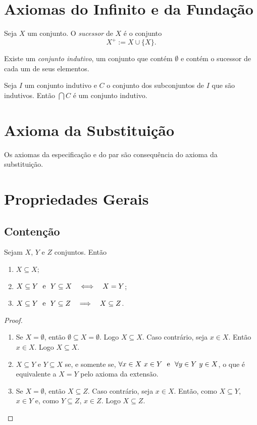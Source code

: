 \section{Axiomas do Infinito e da Fundação}

\begin{defi}
Seja $X$ um conjunto. O \emph{sucessor} de $X$ é o conjunto
	\begin{equation*}
	X^+ := X \cup \{X\}.
	\end{equation*}
\end{defi}

\begin{axi}
Existe um \emph{conjunto indutivo}, um conjunto que contém $\emptyset$ e contém o sucessor de cada um de seus elementos.
\end{axi}

\begin{prop}
Seja $I$ um conjunto indutivo e $C$ o conjunto dos subconjuntos de $I$ que são indutivos. Então $\bigcap C$ é um conjunto indutivo.
\end{prop}

\section{Axioma da Substituição}

Os axiomas da especificação e do par são consequência do axioma da substituição.


\section*{Propriedades Gerais}

\subsection*{Contenção}

\begin{prop}
Sejam $X$, $Y$ e $Z$ conjuntos. Então
	\begin{enumerate}
	\item $X \subseteq X$;
	\item $X \subseteq Y \text{\ \ e\ \ } Y \subseteq X \quad \Longleftrightarrow \quad X=Y$;
	\item $X \subseteq Y \text{\ \ e\ \ } Y \subseteq Z \quad \Longrightarrow \quad X \subseteq Z$.
	\end{enumerate}
\end{prop}
\begin{proof}
	\begin{enumerate}
	\item Se $X=\emptyset$, então $\emptyset \subseteq X = \emptyset$. Logo $X \subseteq X$. Caso contrário, seja $x \in X$. Então $x \in X$. Logo $X \subseteq X$.
	\item $X \subseteq Y$ e $Y \subseteq X$ se, e somente se, $\forall x \in X \ x \in Y \text{\ \ e\ \ } \forall y \in Y \ y \in X$, o que é equivalente a $X=Y$ pelo axioma da extensão.
	\item Se $X=\emptyset$, então $X \subseteq Z$. Caso contrário, seja $x \in X$. Então, como $X \subseteq Y$, $x \in Y$ e, como $Y \subseteq Z$, $x \in Z$. Logo $X \subseteq Z$.
	\end{enumerate}
\end{proof}

